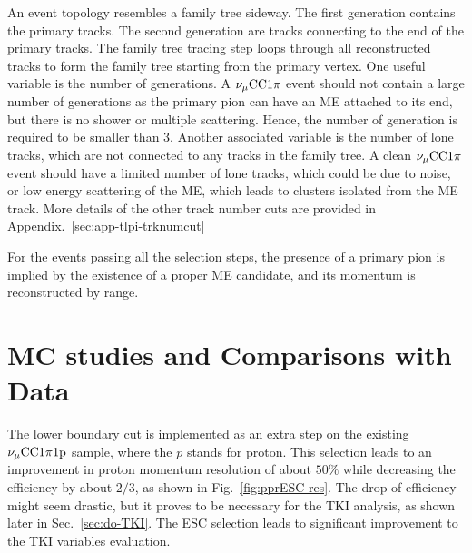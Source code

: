             An event topology resembles a family tree sideway. 
            The first generation contains the primary tracks.
            The second generation are tracks connecting to the end of the primary tracks.
            The family tree tracing step loops through all reconstructed tracks to form the family tree starting from the primary vertex.
            One useful variable is the number of generations.
            A $\nu_{\mu}\textrm{CC}1\pi$ event should not contain a large number of generations as the primary pion can have an ME attached to its end, but there is no shower or multiple scattering.
            Hence, the number of generation is required to be smaller than $3$.
            Another associated variable is the number of lone tracks, which are not connected to any tracks in the family tree. 
            A clean $\nu_{\mu}\textrm{CC}1\pi$ event should have a limited number of lone tracks, which could be due to noise, or low energy scattering of the ME, which leads to clusters isolated from the ME track. 
            More details of the other track number cuts are provided in Appendix.~\ref{sec:app-tlpi-trknumcut}
        
            For the events passing all the selection steps, the presence of a primary pion is implied by the existence of a proper ME candidate, and its momentum is reconstructed by range. 


            
    
    

\section{MC studies and Comparisons with Data}

   The lower boundary cut is implemented as an extra step on the existing $\nu_{\mu}\textrm{CC}1\pi1\textrm{p}$ sample, where the $p$ stands for proton.
   This selection leads to an improvement in proton momentum resolution of about $50\%$ while decreasing the efficiency by about $2/3$, as shown in Fig.~\ref{fig:pprESC-res}.   
   The drop of efficiency might seem drastic, but it proves to be necessary for the TKI analysis, as shown later in Sec.~\ref{sec:do-TKI}. The ESC selection leads to significant improvement to the TKI variables evaluation. 

